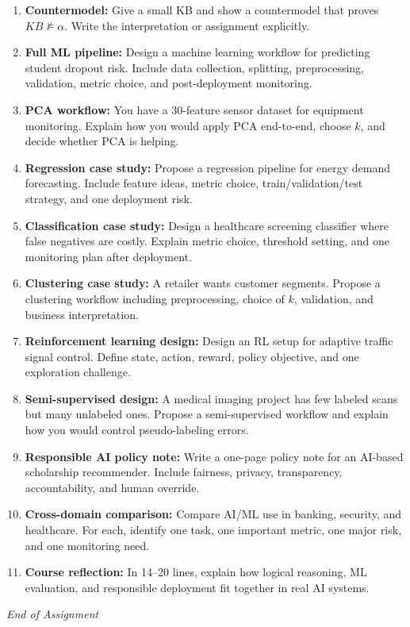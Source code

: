 \documentclass[11pt,a4paper]{article}
\begin{document}
\begin{enumerate}[label=H\arabic*., leftmargin=*]
  \item \textbf{Countermodel:} Give a small KB and show a countermodel that proves $KB \not\models \alpha$.
    Write the interpretation or assignment explicitly.

  \item \textbf{Full ML pipeline:} Design a machine learning workflow for predicting student dropout risk.
    Include data collection, splitting, preprocessing, validation, metric choice, and post-deployment monitoring.

  \item \textbf{PCA workflow:} You have a 30-feature sensor dataset for equipment monitoring.
    Explain how you would apply PCA end-to-end, choose $k$, and decide whether PCA is helping.

  \item \textbf{Regression case study:} Propose a regression pipeline for energy demand forecasting.
    Include feature ideas, metric choice, train/validation/test strategy, and one deployment risk.

  \item \textbf{Classification case study:} Design a healthcare screening classifier where false negatives are costly.
    Explain metric choice, threshold setting, and one monitoring plan after deployment.

  \item \textbf{Clustering case study:} A retailer wants customer segments.
    Propose a clustering workflow including preprocessing, choice of $k$, validation, and business interpretation.

  \item \textbf{Reinforcement learning design:} Design an RL setup for adaptive traffic signal control.
    Define state, action, reward, policy objective, and one exploration challenge.

  \item \textbf{Semi-supervised design:} A medical imaging project has few labeled scans but many unlabeled ones.
    Propose a semi-supervised workflow and explain how you would control pseudo-labeling errors.

  \item \textbf{Responsible AI policy note:} Write a one-page policy note for an AI-based scholarship recommender.
    Include fairness, privacy, transparency, accountability, and human override.

  \item \textbf{Cross-domain comparison:} Compare AI/ML use in banking, security, and healthcare.
    For each, identify one task, one important metric, one major risk, and one monitoring need.

  \item \textbf{Course reflection:} In 14--20 lines, explain how logical reasoning, ML evaluation, and responsible deployment
    fit together in real AI systems.
\end{enumerate}

\vfill
\noindent\textit{End of Assignment}
\end{document}
